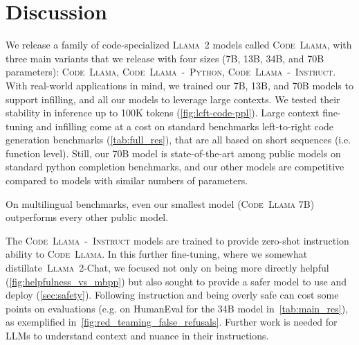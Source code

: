 \section{Discussion}
We release a family of code-specialized \textsc{Llama~2} models called \textsc{Code~Llama}, with three main variants that we release with four sizes (7B, 13B, 34B, and 70B parameters): \textsc{Code~Llama}, \textsc{Code~Llama~-~Python}, \textsc{Code~Llama~-~Instruct}. 
With real-world applications in mind, we trained our 7B, 13B, and 70B models to support infilling, and all our models to leverage large contexts. We tested their stability in inference up to 100K tokens (\ref{fig:lcft-code-ppl}). 
Large context fine-tuning and infilling come at a cost on standard benchmarks left-to-right code generation benchmarks (\ref{tab:full_res}), that are all based on short sequences (i.e. function level). Still, our 70B model is state-of-the-art among public models on standard python completion benchmarks, and our other models are competitive compared to models with similar numbers of parameters. 

On multilingual benchmarks, even our smallest model (\textsc{Code~Llama} 7B) outperforms every other public model. 

The \textsc{Code~Llama~-~Instruct} models are trained to provide zero-shot instruction ability to \textsc{Code~Llama}. In this further fine-tuning, where we somewhat distillate~\textsc{Llama~2}-Chat, we focused not only on being more directly helpful (\ref{fig:helpfulness_vs_mbpp}) but also sought to provide a safer model to use and deploy (\ref{sec:safety}). Following instruction and being overly safe can cost some points on evaluations (e.g. on HumanEval for the 34B model in~\ref{tab:main_res}), as exemplified in~\ref{fig:red_teaming_false_refusals}. Further work is needed for LLMs to understand context and nuance in their instructions.


